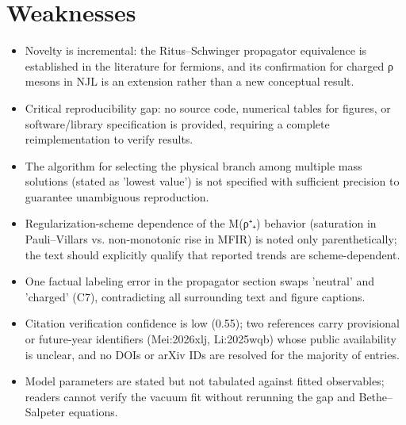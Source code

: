 \documentclass[11pt]{article}
\begin{document}
\section*{Weaknesses}
\begin{itemize}[leftmargin=*]
  \item Novelty is incremental: the Ritus–Schwinger propagator equivalence is established in the literature for fermions, and its confirmation for charged ρ mesons in NJL is an extension rather than a new conceptual result.
  \item Critical reproducibility gap: no source code, numerical tables for figures, or software/library specification is provided, requiring a complete reimplementation to verify results.
  \item The algorithm for selecting the physical branch among multiple mass solutions (stated as 'lowest value') is not specified with sufficient precision to guarantee unambiguous reproduction.
  \item Regularization-scheme dependence of the M(ρ⁺₊) behavior (saturation in Pauli–Villars vs. non-monotonic rise in MFIR) is noted only parenthetically; the text should explicitly qualify that reported trends are scheme-dependent.
  \item One factual labeling error in the propagator section swaps 'neutral' and 'charged' (C7), contradicting all surrounding text and figure captions.
  \item Citation verification confidence is low (0.55); two references carry provisional or future-year identifiers (Mei:2026xlj, Li:2025wqb) whose public availability is unclear, and no DOIs or arXiv IDs are resolved for the majority of entries.
  \item Model parameters are stated but not tabulated against fitted observables; readers cannot verify the vacuum fit without rerunning the gap and Bethe–Salpeter equations.
\end{itemize}
\end{document}
